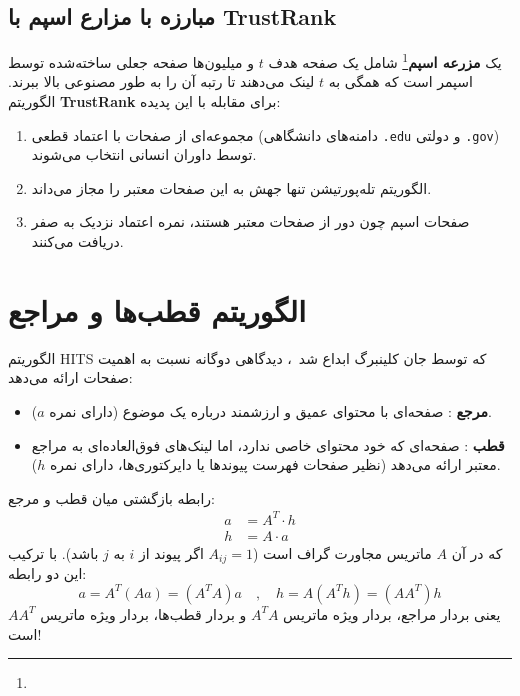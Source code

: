 \subsection{مبارزه با مزارع اسپم با TrustRank}
یک \textbf{مزرعه اسپم}\footnote{} شامل یک صفحه هدف $t$ و میلیون‌ها صفحه جعلی ساخته‌شده توسط اسپمر است که همگی به $t$ لینک می‌دهند تا رتبه آن را به طور مصنوعی بالا ببرند.
الگوریتم \textbf{TrustRank} برای مقابله با این پدیده:
\begin{enumerate}
    \item مجموعه‌ای از صفحات با اعتماد قطعی (دامنه‌های دانشگاهی \texttt{.edu} و دولتی \texttt{.gov}) توسط داوران انسانی انتخاب می‌شوند.
    \item الگوریتم تله‌پورتیشن تنها جهش به این صفحات معتبر را مجاز می‌داند.
    \item صفحات اسپم چون دور از صفحات معتبر هستند، نمره اعتماد  نزدیک به صفر دریافت می‌کنند.
\end{enumerate}

\section{الگوریتم قطب‌ها و مراجع \texorpdfstring{}{(HITS)}}
الگوریتم HITS که توسط جان کلینبرگ ابداع شد~\cite{kleinberg1999authoritative}، دیدگاهی دوگانه نسبت به اهمیت صفحات ارائه می‌دهد:

\begin{definition}
\begin{itemize}
    \item \textbf{مرجع }: صفحه‌ای با محتوای عمیق و ارزشمند درباره یک موضوع (دارای نمره $a$).
    \item \textbf{قطب }: صفحه‌ای که خود محتوای خاصی ندارد، اما لینک‌های فوق‌العاده‌ای به مراجع معتبر ارائه می‌دهد (نظیر صفحات فهرست پیوندها یا دایرکتوری‌ها، دارای نمره $h$).
\end{itemize}
\end{definition}

رابطه بازگشتی میان قطب و مرجع:
\begin{align}
a &= A^T \cdot h \\
h &= A \cdot a
\end{align}
که در آن $A$ ماتریس مجاورت گراف است ($A_{ij} = 1$ اگر پیوند از $i$ به $j$ باشد).
با ترکیب این دو رابطه:
\begin{equation}
a = A^T (A a) = (A^T A) a \quad , \quad h = A (A^T h) = (A A^T) h
\end{equation}
یعنی بردار مراجع، بردار ویژه ماتریس $A^T A$ و بردار قطب‌ها، بردار ویژه ماتریس $A A^T$ است!

